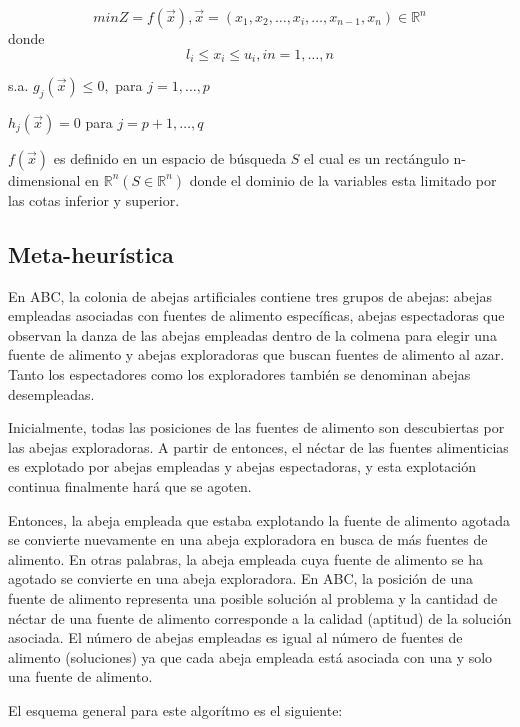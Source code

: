 \documentclass{article}
\begin{document}
$$min Z = f(\vec{x}), \vec{x} = (x_1,x_2,\dots,x_i,\dots,x_{n-1},x_n)\in \mathbb{R}^n$$
donde
$$l_i\leq x_i \leq u_i, in = 1,\dots,n$$

\begin{center}
  \item s.a.  $g_j(\vec{x})\leq 0,$ para $j=1,\dots,p$

  \item $h_j(\vec{x}) = 0$ para $j=p+1,\dots,q$
\end{center}

$f(\vec{x})$ es definido en un espacio de búsqueda $S$ el cual es un rectángulo n-dimensional en $\mathbb{R}^n(S\in \mathbb{R}^n)$ donde el dominio de la variables esta limitado por las cotas inferior y superior. 

\subsection{Meta-heurística}
En ABC, la colonia de abejas artificiales contiene tres grupos de abejas: abejas empleadas asociadas con fuentes de alimento específicas, abejas espectadoras que observan la danza de las abejas empleadas dentro de la colmena para elegir una fuente de alimento y abejas exploradoras que buscan fuentes de alimento al azar. Tanto los espectadores como los exploradores también se denominan abejas desempleadas.

\medskip
Inicialmente, todas las posiciones de las fuentes de alimento son descubiertas por las abejas exploradoras. A partir de entonces, el néctar de las fuentes alimenticias es explotado por abejas empleadas y abejas espectadoras, y esta explotación continua finalmente hará que se agoten. 

\medskip

Entonces, la abeja empleada que estaba explotando la fuente de alimento agotada se convierte nuevamente en una abeja exploradora en busca de más fuentes de alimento. En otras palabras, la abeja empleada cuya fuente de alimento se ha agotado se convierte en una abeja exploradora. En ABC, la posición de una fuente de alimento representa una posible solución al problema y la cantidad de néctar de una fuente de alimento corresponde a la calidad (aptitud) de la solución asociada. El número de abejas empleadas es igual al número de fuentes de alimento (soluciones) ya que cada abeja empleada está asociada con una y solo una fuente de alimento.

\medskip

El esquema general para este algor\'itmo es el siguiente:
\end{document}
